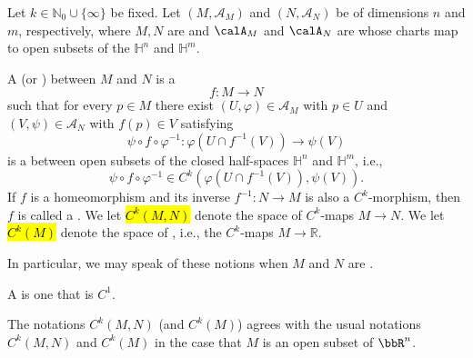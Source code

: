 \begin{definition} \label{definition:C_k_morphism_between_C_k_manifolds}
    Let $k \in \mathbb{N}_0 \cup \{\infty\}$ be fixed. Let $(M, \mathcal{A}_M)$ and $(N, \mathcal{A}_N)$ be  of dimensions $n$ and $m$, respectively, where $M,N$ are  and $\calA_M$ and $\calA_N$ are  whose charts map to open subsets of the  $\mathbb{H}^n$ and $\mathbb{H}^m$.

    A  (or ) between $M$ and $N$ is a 
    $$ f : M \to N $$
    such that for every $p \in M$ there exist  $(U, \varphi) \in \mathcal{A}_M$ with $p \in U$ and $(V, \psi) \in \mathcal{A}_N$ with $f(p) \in V$ satisfying
    $$ \psi \circ f \circ \varphi^{-1} : \varphi(U \cap f^{-1}(V)) \to \psi(V) $$
    is a  between open subsets of the closed half-spaces $\mathbb{H}^n$ and $\mathbb{H}^m$, i.e.,
    $$ \psi \circ f \circ \varphi^{-1} \in C^k(\varphi(U \cap f^{-1}(V)), \psi(V)).  $$
    If $f$ is a homeomorphism and its inverse $f^{-1} : N \to M$ is also a $C^k$-morphism, then $f$ is called a .
    We let \hl{$C^k(M,N)$} denote the space of $C^k$-maps $M \to N$. We let \hl{$C^k(M)$} denote the space of , i.e., the $C^k$-maps $M \to \mathbb{R}$.

    In particular, we may speak of these notions when $M$ and $N$ are .

    A  is one that is $C^1$.

    \end{definition}

    \begin{remark}
        The notations $C^k(M,N)$ (and $C^k(M)$) agrees with the usual notations $C^k(M,N)$ and $C^k(M)$ in the case that $M$ is an open subset of $\bbR^n$.
\end{remark}